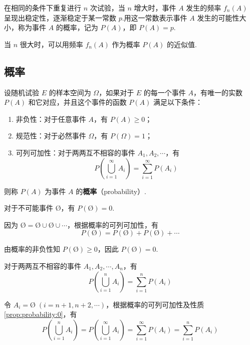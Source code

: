 在相同的条件下重复进行 $n$ 次试验，当 $n$ 增大时，事件 $A$ 发生的频率 $f_n(A)$ 呈现出稳定性，逐渐稳定于某一常数 $p$.用这一常数表示事件 $A$ 发生的可能性大小，称为事件 $A$ 的概率，记为 $P(A)$，即 $P(A)=p$.

当 $n$ 很大时，可以用频率 $f_n(A)$ 作为概率 $P(A)$ 的近似值.

\subsection{概率}

\begin{definition} \label{def:probability}
    设随机试验 $E$ 的样本空间为 $\varOmega$，如果对于 $E$ 的每一个事件 $A$，有唯一的实数 $P(A)$ 和它对应，并且这个事件的函数 $P(A)$ 满足以下条件：
    \begin{enumerate}
        \item 非负性：对于任意事件 $A$，有 $P(A) \geqslant 0$；
        \item 规范性：对于必然事件 $\varOmega$，有 $P(\varOmega)=1$；
        \item 可列可加性：对于两两互不相容的事件 $A_1,A_2,\cdots$，有
        $$
        P(\bigcup_{i=1}^\infty A_i) = \sum_{i=1}^\infty P(A_i)
        $$
    \end{enumerate}
    则称 $P(A)$ 为事件 $A$ 的\textbf{概率}（probability）.
\end{definition}

\setcounter{propertyname}{0}

\begin{property} \label{prop:probability:0}
    对于不可能事件 $\text{\O}$，有 $P(\text{\O})=0$.
\end{property}

\begin{myproof}
    因为 $\text{\O} = \text{\O} \cup \text{\O} \cup \cdots$，根据概率的可列可加性，有
    $$
    P(\text{\O}) = P(\text{\O}) + P(\text{\O}) + \cdots
    $$

    由概率的非负性知 $P(\text{\O}) \geqslant 0$，因此 $P(\text{\O})=0$.
\end{myproof}

\begin{property}[（有限可加性）] \label{prop:probability:sum}
    对于两两互不相容的事件 $A_1,A_2,\cdots,A_n$，有
    \[
    P(\bigcup_{i=1}^n A_i) = \sum_{i=1}^n P(A_i)
    \]
\end{property}

\begin{myproof}
    令 $A_i = \text{\O} \;(i=n+1,n+2,\cdots)$，根据概率的可列可加性及性质\ref*{prop:probability:0}，有
    \[
    P(\bigcup_{i=1}^n A_i) = P(\bigcup_{i=1}^\infty A_i) = \sum_{i=1}^\infty P(A_i) = \sum_{i=1}^n P(A_i)
    \]
\end{myproof}

